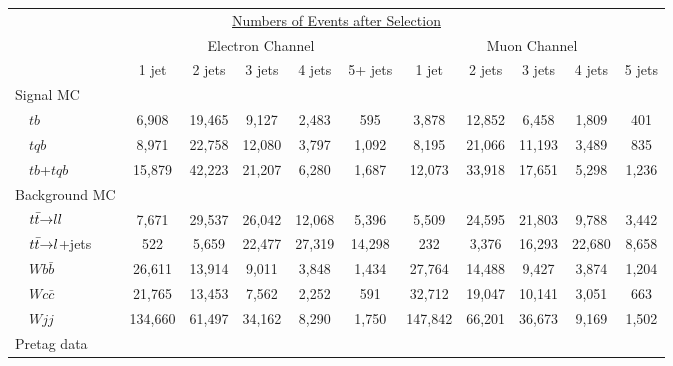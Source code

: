 \begin{table}[!h!tbp]
\begin{center}
\begin{minipage}{6.5 in}
\begin{ruledtabular}
\begin{tabular}{l||ccccc|ccccc}
\multicolumn{11}{c}{\hspace{1in}\underline{Numbers of Events after Selection}} \vspace{0.1in}\\
& \multicolumn{5}{c|}{Electron Channel} & \multicolumn{5}{c}{Muon Channel} \\
                         & 1 jet & 2 jets & 3 jets & 4 jets & 5+ jets
                         & 1 jet & 2 jets & 3 jets & 4 jets & 5 jets \\
\hline			                   
Signal MC                &         &        &        &        &        &         &        &        &        &       \\
~~$tb$                   &   6,908 & 19,465 &  9,127 &  2,483 &   595  &   3,878 & 12,852 &  6,458 &  1,809 &   401 \\
~~$tqb$                  &   8,971 & 22,758 & 12,080 &  3,797 &  1,092 &   8,195 & 21,066 & 11,193 &  3,489 &   835 \\
~~$tb$+$tqb$             &  15,879 & 42,223 & 21,207 &  6,280 &  1,687 &  12,073 & 33,918 & 17,651 &  5,298 & 1,236 \\
Background MC            &         &        &        &        &        &         &        &        &        &       \\
~~${\mbox{$t\bar{t}$}}{\rightarrow}ll$	 &   7,671 & 29,537 & 26,042 & 12,068 &  5,396 &   5,509 & 24,595 & 21,803 &  9,788 & 3,442 \\
~~${\mbox{$t\bar{t}$}}{\rightarrow}l$+jets &     522 &  5,659 & 22,477 & 27,319 & 14,298 &     232 &  3,376 & 16,293 & 22,680 & 8,658 \\ 
~~$Wb\bar{b}$            &  26,611 & 13,914 &  9,011 &  3,848 &  1,434 &  27,764 & 14,488 &  9,427 &  3,874 & 1,204 \\
~~$Wc\bar{c}$            &  21,765 & 13,453 &  7,562 &  2,252 &    591 &  32,712 & 19,047 & 10,141 &  3,051 &   663 \\
~~$Wjj$                  & 134,660 & 61,497 & 34,162 &  8,290 &  1,750 & 147,842 & 66,201 & 36,673 &  9,169 & 1,502 \\
Pretag data              &         &        &        &        &        &         &        &        &        &       \\

\end{tabular}
\end{ruledtabular}
\end{minipage}
\end{center}
\end{table}
